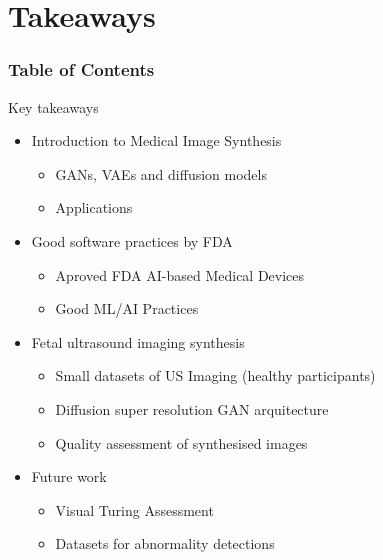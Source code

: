 \section{Takeaways}
\begin{frame}
  \frametitle{Table of Contents}
  \tableofcontents[currentsection]
\end{frame}

{


\begin{frame}{Key takeaways}
\begin{itemize}
\item Introduction to Medical Image Synthesis 
    \begin{itemize}
    \item GANs, VAEs and diffusion models
    \item Applications
    \end{itemize}

\item Good software practices by FDA
    \begin{itemize}
    \item Aproved FDA AI-based Medical Devices
    \item Good ML/AI Practices 
    \end{itemize}

\item Fetal ultrasound imaging synthesis 
    \begin{itemize}
    \item Small datasets of US Imaging (healthy participants)
    \item Diffusion super resolution GAN arquitecture
    \item Quality assessment of synthesised images
    \end{itemize}

\item Future work
    \begin{itemize}
    \item Visual Turing Assessment 
    \item Datasets for abnormality detections
    \end{itemize}

\end{itemize}

\end{frame}
}




%


